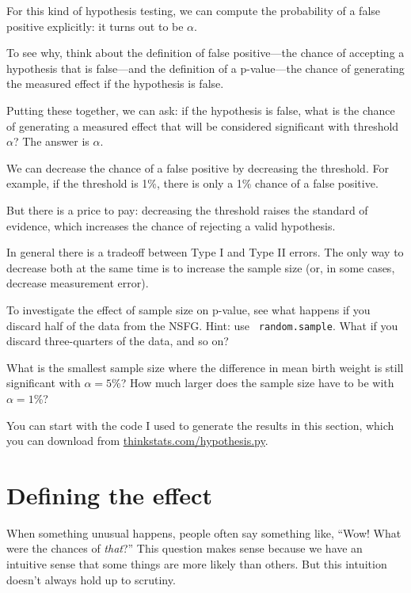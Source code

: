\documentclass[12pt]{book}
\begin{document}
For this kind of hypothesis testing, we can compute the probability of
a false positive explicitly: it turns out to be $\alpha$.

To see why, think about the definition of false positive---the chance
of accepting a hypothesis that is false---and the definition of a
p-value---the chance of generating the measured effect if the
hypothesis is false.

Putting these together, we can ask: if the hypothesis is false,
what is the chance of generating a measured effect that will be
considered significant with threshold $\alpha$?  The answer is
$\alpha$.

We can decrease the chance of a false positive by decreasing the
threshold.  For example, if the threshold is 1\%, there is only a 1\%
chance of a false positive.

But there is a price to pay: decreasing the threshold raises the
standard of evidence, which increases the chance of rejecting
a valid hypothesis.

In general there is a tradeoff between Type I and Type II errors.
The only way to decrease both at the same time is to increase the
sample size (or, in some cases, decrease measurement error).

\begin{ex}

To investigate the effect of sample size on p-value, see what happens
if you discard half of the data from the NSFG.  Hint: use {\tt
  random.sample}.  What if you discard three-quarters of the data, and
so on?

What is the smallest sample size where the difference in mean birth
weight is still significant with $\alpha=5$\%?  How much
larger does the sample size have to be with $\alpha=1$\%?

You can start with the code I used to generate the results in this
section, which you can download from \url{thinkstats.com/hypothesis.py}.

\end{ex}


\section{Defining the effect}

When something unusual happens, people often say something like,
``Wow!  What were the chances of {\em that}?''  This question makes
sense because we have an intuitive sense that some things are more
likely than others.  But this intuition doesn't always hold up to
scrutiny.
\end{document}
